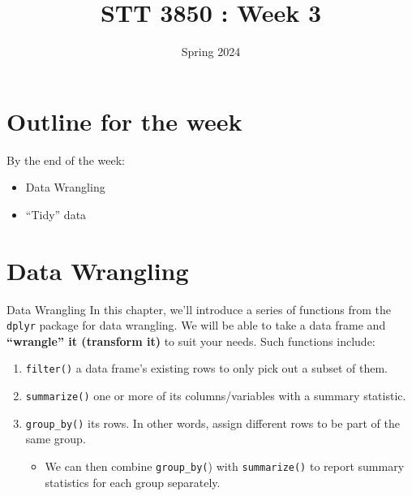 \documentclass[
  ignorenonframetext,
]{beamer}
\title{STT 3850 : Week 3}
\author{Spring 2024}
\date{}
\institute{Appalachian State University}
\providecommand{\tightlist}{%
  \setlength{\itemsep}{0pt}\setlength{\parskip}{0pt}}
\begin{document}
\frame{\titlepage}

\hypertarget{outline-for-the-week}{%
\section{Outline for the week}\label{outline-for-the-week}}

\begin{frame}{By the end of the week:}
\protect\hypertarget{by-the-end-of-the-week}{}
\begin{itemize}
\tightlist
\item
  Data Wrangling
\item
  ``Tidy'' data
\end{itemize}
\end{frame}

\hypertarget{data-wrangling}{%
\section{Data Wrangling}\label{data-wrangling}}

\begin{frame}[fragile]{Data Wrangling}
\protect\hypertarget{data-wrangling-1}{}
In this chapter, we'll introduce a series of functions from the
\texttt{dplyr} package for data wrangling. We will be able to take a
data frame and \textbf{``wrangle'' it (transform it)} to suit your
needs. Such functions include:

\begin{enumerate}
\item
  \texttt{filter()} a data frame's existing rows to only pick out a
  subset of them.
\item
  \texttt{summarize()} one or more of its columns/variables with a
  summary statistic.
\item
  \texttt{group\_by()} its rows. In other words, assign different rows
  to be part of the same group.

  \begin{itemize}
  \tightlist
  \item
    We can then combine \texttt{group\_by(}) with \texttt{summarize()}
    to report summary statistics for each group separately.
  \end{itemize}
\end{enumerate}
\end{frame}
\end{document}
